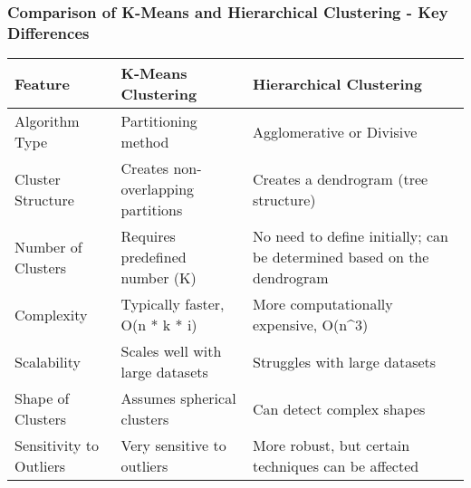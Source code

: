 \documentclass[aspectratio=169]{beamer}
\begin{document}
\begin{frame}[fragile]
    \frametitle{Comparison of K-Means and Hierarchical Clustering - Key Differences}

    \begin{table}[ht]
        \centering
        \begin{tabular}{|l|l|l|}
            \hline
            \textbf{Feature}                & \textbf{K-Means Clustering}                            & \textbf{Hierarchical Clustering}                \\
            \hline
            Algorithm Type                  & Partitioning method                                    & Agglomerative or Divisive                      \\
            \hline
            Cluster Structure                & Creates non-overlapping partitions                     & Creates a dendrogram (tree structure)          \\
            \hline
            Number of Clusters               & Requires predefined number (K)                        & No need to define initially; can be determined based on the dendrogram \\
            \hline
            Complexity                       & Typically faster, O(n * k * i)                       & More computationally expensive, O(n^3)         \\
            \hline
            Scalability                      & Scales well with large datasets                        & Struggles with large datasets                   \\
            \hline
            Shape of Clusters               & Assumes spherical clusters                             & Can detect complex shapes                       \\
            \hline
            Sensitivity to Outliers          & Very sensitive to outliers                            & More robust, but certain techniques can be affected \\
            \hline
        \end{tabular}
    \end{table}
\end{frame}
\end{document}
